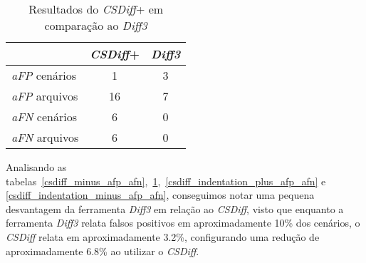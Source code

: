 \begin{table}[ht]
	\begin{center}
		\begin{tabular}{|l|c|c|}
			\hline
			\textbf{ }          & \textbf{\emph{CSDiff}+} & \textbf{\emph{Diff3}} \\
			\hline
			\emph{aFP} cenários & 1                       & 3                     \\
			\emph{aFP} arquivos & 16                      & 7                     \\
			\emph{aFN} cenários & 6                       & 0                     \\
			\emph{aFN} arquivos & 6                       & 0                     \\
			\hline
		\end{tabular}
	\end{center}
	\caption{Resultados do \emph{CSDiff}+ em comparação ao \emph{Diff3}}\label{csdiff_plus_afp_afn}
\end{table}

Analisando as
tabelas~\ref{csdiff_minus_afp_afn},~\ref{csdiff_plus_afp_afn},~\ref{csdiff_indentation_plus_afp_afn}
e \ref{csdiff_indentation_minus_afp_afn}, conseguimos notar uma pequena
desvantagem da ferramenta \emph{Diff3} em relação ao \emph{CSDiff}, visto que
enquanto a ferramenta \emph{Diff3} relata falsos positivos em aproximadamente
10\% dos cenários, o \emph{CSDiff} relata em aproximadamente 3.2\%,
configurando uma redução de aproximadamente 6.8\% ao utilizar o \emph{CSDiff}.

